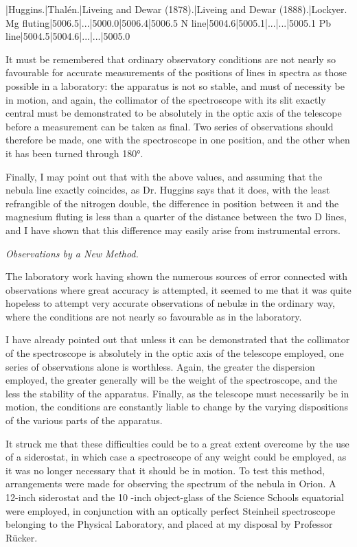 \documentclass[a4paper, 12pt, oneside, polutonikogreek, english]{article}
\begin{document}
|Huggins.|Thalén.|Liveing and Dewar (1878).|Liveing and Dewar (1888).|Lockyer. 
Mg fluting|5006.5|...|5000.0|5006.4|5006.5 
N line|5004.6|5005.1|...|...|5005.1 
Pb line|5004.5|5004.6|...|...|5005.0 

It must be remembered that ordinary observatory conditions are not nearly so favourable for accurate measurements of the positions of lines in spectra as those possible in a laboratory: the apparatus is not so stable, and must of necessity be in motion, and again, the collimator of the spectroscope with its slit exactly central must be demonstrated to be absolutely in the optic axis of the telescope before a measurement can be taken as final. Two series of observations should therefore be made, one with the spectroscope in one position, and the other when it has been turned through 180°.

Finally, I may point out that with the above values, and assuming that the nebula line exactly coincides, as Dr. Huggins says that it does, with the least refrangible of the nitrogen double, the difference in position between it and the magnesium fluting is less than a quarter of the distance between the two D lines, and I have shown that this difference may easily arise from instrumental errors.

\emph{Observations by a New Method.}

The laboratory work having shown the numerous sources of error connected with observations where great accuracy is attempted, it seemed to me that it was quite hopeless to attempt very accurate observations of nebulæ in the ordinary way, where the conditions are not nearly so favourable as in the laboratory.

I have already pointed out that unless it can be demonstrated that the collimator of the spectroscope is absolutely in the optic axis of the telescope employed, one series of observations alone is worthless. Again, the greater the dispersion employed, the greater generally will be the weight of the spectroscope, and the less the stability of the apparatus. Finally, as the telescope must necessarily be in motion, the conditions are constantly liable to change by the varying dispositions of the various parts of the apparatus.

It struck me that these difficulties could be to a great extent overcome by the use of a siderostat, in which case a spectroscope of any weight could be employed, as it was no longer necessary that it should be in motion. To test this method, arrangements were made for observing the spectrum of the nebula in Orion. A 12-inch siderostat and the 10 -inch object-glass of the Science Schools equatorial were employed, in conjunction with an optically perfect Steinheil spectroscope belonging to the Physical Laboratory, and placed at my disposal by Professor Rücker.
\end{document}
